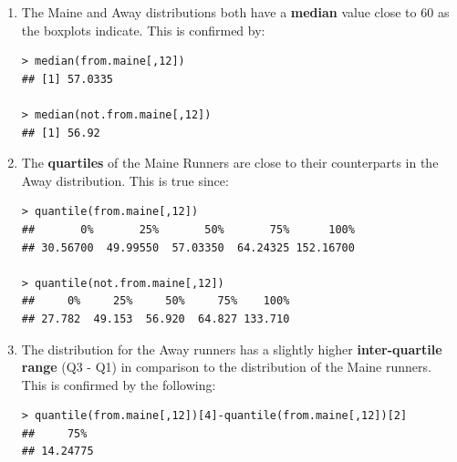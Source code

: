 \documentclass[12pt,letterpaper,titlepage,en-US]{article}
\begin{document}
\begin{enumerate}

\item The Maine and Away distributions both have a \textbf{median} value close to 60 as the boxplots indicate. This is confirmed by:
\begin{knitrout}
\color{fgcolor}
\begin{kframe}

\begin{verbatim}
> median(from.maine[,12])
## [1] 57.0335

> median(not.from.maine[,12])
## [1] 56.92
\end{verbatim}
\end{kframe}
\end{knitrout}



\item The \textbf{quartiles} of the Maine Runners are close to their counterparts in the Away distribution. This is true since:

\begin{knitrout}
\color{fgcolor}
\begin{kframe}

\begin{verbatim}
> quantile(from.maine[,12])
##       0%       25%       50%       75%      100% 
## 30.56700  49.99550  57.03350  64.24325 152.16700 

> quantile(not.from.maine[,12])
##     0%     25%     50%     75%    100% 
## 27.782  49.153  56.920  64.827 133.710 
\end{verbatim}
\end{kframe}
\end{knitrout}




\item  The distribution for the Away runners has a slightly higher \textbf{inter-quartile range} (Q3 - Q1) in comparison to the distribution of the Maine runners. This is confirmed by the following:

\begin{knitrout}
\color{fgcolor}
\begin{kframe}

\begin{verbatim}
> quantile(from.maine[,12])[4]-quantile(from.maine[,12])[2]
##     75% 
## 14.24775 


\end{verbatim}
\end{kframe}
\end{knitrout}
\end{enumerate}
\end{document}
